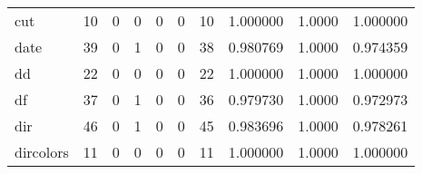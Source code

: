 \begin{tabular}{lrrrrrrrrr}
cut       &                                       10 &                                                  0 &                                                  0 &                                                  0 &                                                  0 &                                                 10 &                                           1.000000 &                                 1.0000 &                             1.000000 \\
date      &                                       39 &                                                  0 &                                                  1 &                                                  0 &                                                  0 &                                                 38 &                                           0.980769 &                                 1.0000 &                             0.974359 \\
dd        &                                       22 &                                                  0 &                                                  0 &                                                  0 &                                                  0 &                                                 22 &                                           1.000000 &                                 1.0000 &                             1.000000 \\
df        &                                       37 &                                                  0 &                                                  1 &                                                  0 &                                                  0 &                                                 36 &                                           0.979730 &                                 1.0000 &                             0.972973 \\
dir       &                                       46 &                                                  0 &                                                  1 &                                                  0 &                                                  0 &                                                 45 &                                           0.983696 &                                 1.0000 &                             0.978261 \\
dircolors &                                       11 &                                                  0 &                                                  0 &                                                  0 &                                                  0 &                                                 11 &                                           1.000000 &                                 1.0000 &                             1.000000 \\

\end{tabular}
